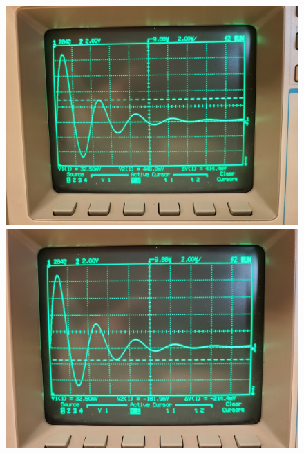 \documentclass[11pt]{article}
\begin{document}
	\begin{figure}[H]
		\centering
		\includegraphics[width=6.in]{images/20210305_141307.jpg}
		\includegraphics[width=6.in]{images/20210305_141320.jpg}
	\end{figure}
\end{document}
